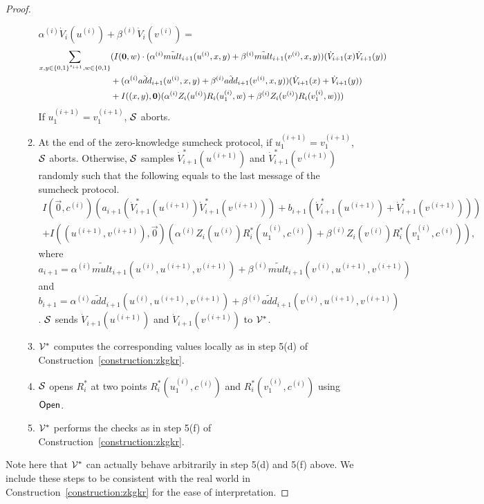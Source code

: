 \begin{proof}
\begin{enumerate}
\begin{enumerate}
	$\alpha^{(i)}\dot{V}_i(u^{(i)})+\beta^{(i)}\dot{V}_i(v^{(i)})=$
	\begin{align*}
	\sum_{x, y\in \binary^{s_{i+1}},w \in \binary}&(I(\vec{0},w) \cdot (\alpha^{(i)}\tilde{mult}_{i+1}(u^{(i)}, x, y)+\beta^{(i)}\tilde{mult}_{i+1}(v^{(i)}, x, y))(\dot{V}_{i+1}(x)\dot{V}_{i+1}(y))\\
	&+(\alpha^{(i)}\tilde{add}_{i+1}(u^{(i)}, x, y)+\beta^{(i)}\tilde{add}_{i+1}(v^{(i)}, x, y))(\dot{V}_{i+1}(x)+\dot{V}_{i+1}(y))\nonumber\\
	&+ I((x, y), \vec{0})(\alpha^{(i)}Z_i(u^{(i)})R_i(u_1^{(i)}, w)+\beta^{(i)}Z_i(v^{(i)})R_i(v_1^{(i)}, w)))
	\end{align*}
	If $u_1^{(i+1)} = v_1^{(i+1)}$, $\S$ aborts.
	
	\item At the end of the zero-knowledge sumcheck protocol, if $u_1^{(i+1)} = v_1^{(i+1)}$, $\S$ aborts. Otherwise, $\S$ samples $\dot{V}^*_{i+1}(u^{(i+1)})$ and $\dot{V}^*_{i+1}(v^{(i+1)})$ randomly such that the following equals to the last message of the sumcheck protocol.
	\begin{align*}
	I(\vec{0},c^{(i)})(a_{i+1}(\dot{V}^*_{i+1}(u^{(i+1)})\dot{V}^*_{i+1}(v^{(i+1)}))+b_{i+1}(\dot{V}^*_{i+1}(u^{(i+1)})+\dot{V}^*_{i+1}(v^{(i+1)})))\\
	+I((u^{(i+1)},v^{(i+1)}),\vec{0})(\alpha^{(i)}Z_i(u^{(i)})R^*_i(u_1^{(i)}, c^{(i)})+\beta^{(i)}Z_i(v^{(i)})R^*_i(v_1^{(i)}, c^{(i)})),
	\end{align*}
	where $a_{i+1} = \alpha^{(i)}\tilde{mult}_{i+1}(u^{(i)}, u^{(i+1)}, v^{(i+1)})+\beta^{(i)}\tilde{mult}_{i+1}(v^{(i)}, u^{(i+1)}, v^{(i+1)})$ and $b_{i+1} = \alpha^{(i)}\tilde{add}_{i+1}(u^{(i)}, u^{(i+1)}, v^{(i+1)})+\beta^{(i)}\tilde{add}_{i+1}(v^{(i)}, u^{(i+1)}, v^{(i+1)})$. $\S$ sends $\dot{V}_{i+1}(u^{(i+1)})$ and $\dot{V}_{i+1}(v^{(i+1)})$ to $\V^*$.
	
	\item $\V^*$ computes the corresponding values locally as in step 5(d) of Construction~\ref{construction:zkgkr}.
	\item $\S$ opens $R^*_i$ at two points $R^*_i(u_1^{(i)},c^{(i)})$ and $R^*_i(v_1^{(i)},c^{(i)})$ using $\Open$.
	\item $\V^*$ performs the checks as in step 5(f) of Construction~\ref{construction:zkgkr}.
	\end{enumerate}
\end{enumerate} 

Note here that $\V^*$ can actually behave arbitrarily in step 5(d) and 5(f) above. We include these steps to be consistent with the real world in  Construction~\ref{construction:zkgkr} for the ease of interpretation.


\end{proof}
